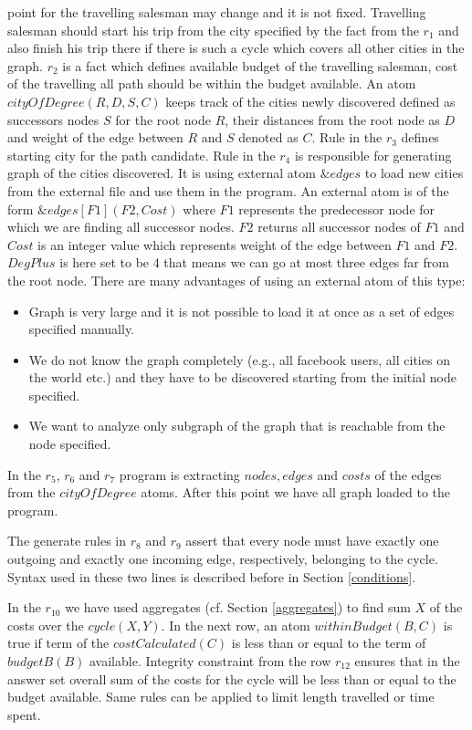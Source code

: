 \documentclass[a4paper, titlepage]{article}
\newcommand{\ext}[3]{\ensuremath{\&{#1}[#2](#3)}}
\begin{document}
point for the travelling salesman may change and it is not 
fixed. Travelling salesman should start his trip from the 
city specified by the fact from the $r_1$ and also finish 
his trip there if there is such a cycle which covers all 
other cities in the graph. $r_2$ is a fact which defines 
available budget of the travelling salesman, cost of the 
travelling all path should be within the budget
available. An atom $\mathit{cityOfDegree(R,D,S,C)}$ keeps 
track of the cities newly discovered defined as successors 
nodes $S$ for the root node $R$, their distances from the 
root node as $D$ and weight of the edge between $R$ and $S$ 
denoted as $C$. Rule in the $r_3$ defines starting city for 
the path candidate. Rule in the $r_4$ is responsible for 
generating graph of 
the cities discovered. It is using external atom 
$\mathit{\&edges}$ to load new cities from the external 
file and use them in the program. An external atom is of 
the form $\ext{edges}{F1}{F2,Cost}$ where $\mathit{F1}$ 
represents the predecessor node for which we are finding 
all successor 
nodes. $\mathit{F2}$ returns all successor nodes of 
$\mathit{F1}$ and $\mathit{Cost}$ is an integer value which 
represents weight of the edge between $\mathit{F1}$ and 
$\mathit{F2}$. $\mathit{DegPlus}$ is here set to be 4 that 
means we can go at most three edges far from the root node. 
There are many advantages of using an external atom of this
type:
\begin{itemize}
\item Graph is very large and it is not possible to load it 
at once as a set of edges specified manually.
\item We do not know the graph completely (e.g., all 
facebook users, all cities on the world etc.) and they have 
to be discovered starting from the initial node specified.
\item We want to analyze only subgraph of the graph that is 
reachable from the node specified.
\end{itemize}    
In the $r_5$, $r_6$ and $r_7$ program is extracting 
$\mathit{nodes}, \mathit{edges}$ and $\mathit{costs}$ of 
the edges from the $\mathit{cityOfDegree}$ atoms. After 
this point we have all graph loaded to the program. 

The generate rules in $r_8$ and $r_{9}$ assert that every 
node must have exactly one outgoing and exactly one 
incoming edge, respectively, belonging to the cycle. Syntax 
used in these two lines is described before in Section 
\ref{conditions}.

In the $r_{10}$ we have used aggregates (cf. Section 
\ref{aggregates}) to find sum $X$ of the costs over the 
$\mathit{cycle(X,Y)}$. In the next row, an atom 
$\mathit{withinBudget(B,C)}$ is true if term of the 
$\mathit{costCalculated(C)}$ is less than or equal to the 
term of $\mathit{budgetB(B)}$ available. Integrity 
constraint from the row $r_{12}$ ensures that in the answer 
set overall sum of the costs for the cycle will be less 
than or equal to the budget available. Same rules can be applied to limit length travelled or time spent.
\end{document}
